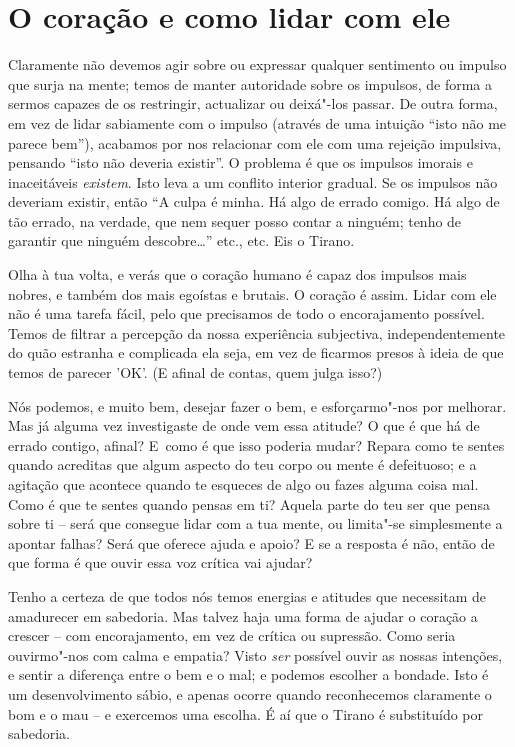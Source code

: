 \section{O coração e como lidar com ele}

Claramente não devemos agir sobre ou expressar qualquer sentimento ou
impulso que surja na mente; temos de manter autoridade sobre os
impulsos, de forma a sermos capazes de os restringir, actualizar ou
deixá"-los passar. De outra forma, em vez de lidar sabiamente com o
impulso (através de uma intuição “isto não me parece bem”), acabamos por
nos relacionar com ele com uma rejeição impulsiva, pensando “isto não
deveria existir”. O problema é que os impulsos imorais e inaceitáveis
\emph{existem}. Isto leva a um conflito interior gradual. Se os impulsos
não deveriam existir, então “A culpa é minha. Há algo de
errado comigo. Há algo de tão errado, na verdade, que nem sequer posso
contar a ninguém; tenho de garantir que ninguém descobre\ldots{}” etc., etc.
Eis o Tirano.

Olha à tua volta, e verás que o coração humano é capaz dos impulsos mais
nobres, e também dos mais egoístas e brutais. O coração é assim. Lidar
com ele não é uma tarefa fácil, pelo que precisamos de todo o
encorajamento possível. Temos de filtrar a percepção da nossa
experiência subjectiva, independentemente do quão estranha e complicada
ela seja, em vez de ficarmos presos à ideia de que temos de parecer
'OK'. (E afinal de contas, quem julga isso?)

Nós podemos, e muito bem, desejar fazer o bem, e esforçarmo"-nos por
melhorar. Mas já alguma vez investigaste de onde vem essa atitude? O que
é que há de errado contigo, afinal? E~como é que isso poderia mudar?
Repara como te sentes quando acreditas que algum aspecto do teu corpo ou
mente é defeituoso; e a agitação que acontece quando te esqueces de algo
ou fazes alguma coisa mal. Como é que te sentes quando pensas em ti?
Aquela parte do teu ser que pensa sobre ti -- será que consegue lidar
com a tua mente, ou limita"-se simplesmente a apontar falhas? Será que
oferece ajuda e apoio? E se a resposta é não, então de que forma é que
ouvir essa voz crítica vai ajudar?

\sectionBreak

Tenho a certeza de que todos nós temos energias e atitudes que
necessitam de amadurecer em sabedoria. Mas talvez haja uma forma de
ajudar o coração a crescer -- com encorajamento, em vez de crítica ou
supressão. Como seria ouvirmo"-nos com calma e empatia? Visto \emph{ser}
possível ouvir as nossas intenções, e sentir a diferença entre o bem e o
mal; e podemos escolher a bondade. Isto é um desenvolvimento sábio, e
apenas ocorre quando reconhecemos claramente o bom e o mau -- e
exercemos uma escolha. É aí que o Tirano é substituído por sabedoria.

